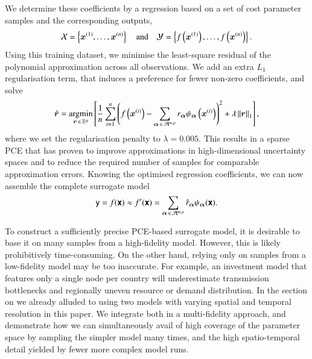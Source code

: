 We determine these coefficients by a regression based on
a set of cost parameter samples
and the corresponding outputs,
\begin{equation}
    \mathcal{X} = \left\{ \bm x^{(1)},\dots,\bm x^{(n)} \right\} \quad\text{and}\quad
    \mathcal{Y} = \left\{ f\left(\bm x^{(1)}\right),\dots,f\left(\bm x^{(n)}\right) \right\}.
\end{equation}
Using this training dataset, we minimise the least-square residual of the polynomial approximation across all observations.
We add an extra $L_1$ regularisation term, %
that induces a preference for fewer non-zero coefficients, and solve
\begin{equation}
    \hat{\bm{r}} = \operatorname*{\arg\!\min}_{\bm{r} \,\in\, \mathbb{R}^q} \left[ \frac{1}{n} \sum_{i=1}^n \left(
        f\left(\bm x^{(i)}\right) - \sum_{{\bm{\alpha}} \,\in\, \mathcal{A}^{m,p}} r_{\bm{\alpha}} \psi_{\bm{\alpha}}\left(\bm x^{(i)}\right)
        \right)^2  + \lambda \left\lVert\bm{r}\right\rVert_1 \right],
        \label{eq:regression}
    \end{equation}
where we set the regularisation penalty to $\lambda=0.005$.
This results in a sparse PCE that has proven to
improve approximations in high-dimensional uncertainty spaces
and to reduce the required number of samples for comparable approximation errors.\cite{gratiet_metamodel-based_2015}
Knowing the optimised regression coefficients, we can now assemble the complete surrogate model
\begin{equation}
    \mathsf{y} = f(\boldsymbol{\mathsf{x}}) \approx f'(\boldsymbol{\mathsf{x}}) = \sum_{{\bm{\alpha}} \,\in\, \mathcal{A}^{m,p}} \hat{r}_{\bm{\alpha}} \psi_{\bm{\alpha}} (\boldsymbol{\mathsf{x}}).
\end{equation}



To construct a sufficiently precise PCE-based surrogate model, it is desirable
to base it on many samples from a high-fidelity model. However, this is likely
prohibitively time-consuming. On the other hand, relying only on samples from a
low-fidelity model may be too inaccurate.\cite{ng_multifidelity_2012} For
example, an investment model that features only a single node per country will
underestimate transmission bottlenecks and regionally uneven resource or demand
distribution. In the section on  we already alluded to using two models with
varying spatial and temporal resolution in this paper. We integrate both in a
multi-fidelity approach,\cite{ng_multifidelity_2012,palar_multi-fidelity_2016}
and demonstrate how we can simultaneously avail of high coverage of the
parameter space by sampling the simpler model many times, and the high
spatio-temporal detail yielded by fewer more complex model runs.

